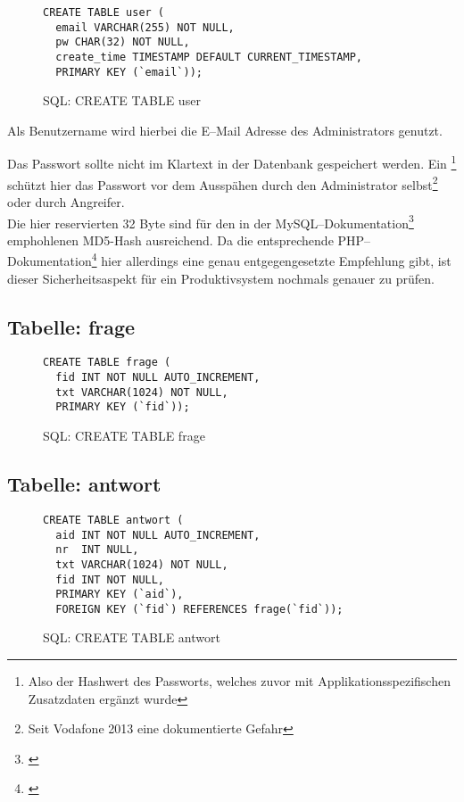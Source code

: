 \begin{figure}[h]
\begin{verbatim}
CREATE TABLE user (
  email VARCHAR(255) NOT NULL,
  pw CHAR(32) NOT NULL,
  create_time TIMESTAMP DEFAULT CURRENT_TIMESTAMP,
  PRIMARY KEY (`email`));
\end{verbatim}
\caption{SQL: CREATE TABLE user}
\label{sql:tbluser}
\end{figure}

Als Benutzername wird hierbei die E--Mail Adresse des Administrators genutzt. 

Das Passwort sollte nicht im Klartext in der Datenbank gespeichert werden. Ein \footnote{Also der Hashwert des Passworts, welches zuvor mit Applikationsspezifischen Zusatzdaten ergänzt wurde} schützt hier das Passwort vor dem Ausspähen durch den Administrator selbst\footnote{Seit Vodafone 2013 eine dokumentierte Gefahr} oder durch Angreifer.\\
Die hier reservierten 32 Byte sind für den in der MySQL--Dokumentation\footnote{\cite{mysql-pcrypt}} emphohlenen MD5-Hash ausreichend. Da die entsprechende PHP--Dokumentation\footnote{\cite{php-pcrypt}} hier allerdings eine genau entgegengesetzte Empfehlung gibt, ist dieser Sicherheitsaspekt für ein Produktivsystem nochmals genauer zu prüfen.

\subsection{Tabelle: frage}
\begin{figure}[h]
\begin{verbatim}
CREATE TABLE frage (
  fid INT NOT NULL AUTO_INCREMENT,
  txt VARCHAR(1024) NOT NULL,
  PRIMARY KEY (`fid`));
\end{verbatim}
\caption{SQL: CREATE TABLE frage}
\label{sql:tblfrage}
\end{figure}

\subsection{Tabelle: antwort}
\begin{figure}[h]
\begin{verbatim}
CREATE TABLE antwort (
  aid INT NOT NULL AUTO_INCREMENT,
  nr  INT NULL,
  txt VARCHAR(1024) NOT NULL,
  fid INT NOT NULL,
  PRIMARY KEY (`aid`),
  FOREIGN KEY (`fid`) REFERENCES frage(`fid`));
\end{verbatim}
\caption{SQL: CREATE TABLE antwort}
\label{sql:tblantwort}
\end{figure}

